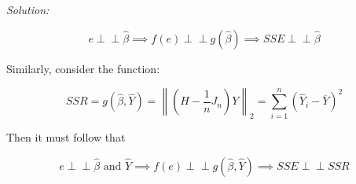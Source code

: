 \documentclass{article}
\newenvironment{solution}
    {\textit{Solution:}}
    {}
\newcommand{\indep}{\perp \!\!\! \perp}
\newcommand{\norm}[1]{\left\lVert#1\right\rVert}
\begin{document}
\begin{solution}
\begin{enumerate}[(a)]
$$e \indep \hat \beta \implies f(e) \indep g(\hat \beta) \implies SSE \indep \hat \beta$$

Similarly, consider the function:

$$SSR = g(\hat \beta, \hat Y) = \norm{(H - \frac{1}{n} J_n)Y}_2 = \sum_{i = 1}^n (\hat Y_i - \overline{Y})^2$$

Then it must follow that 

$$e \indep \hat \beta \text{ and } \hat Y \implies f(e) \indep g(\hat \beta, \hat Y) \implies SSE \indep SSR$$

\end{enumerate}
\end{solution}
\end{document}
